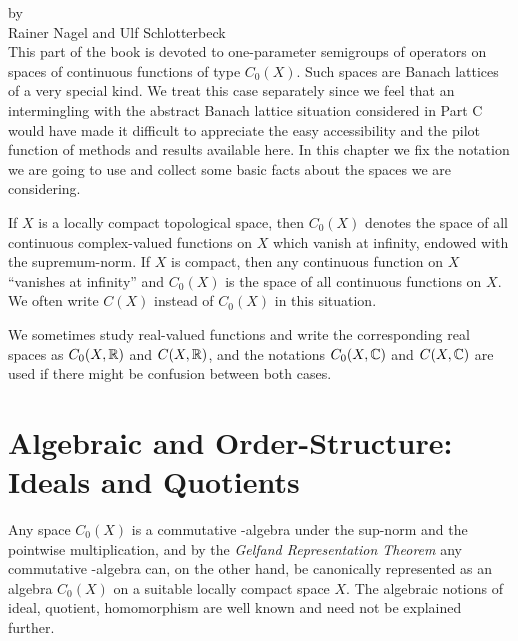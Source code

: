 \label{chap:b1}%
{\Large
\vspace*{-.75cm}
by \\[.25em]
Rainer Nagel and Ulf Schlotterbeck
\vspace{.75cm}
\\
}
This part of the book is devoted to one-parameter semigroups of operators on spaces of continuous functions of type $C_{0}(X)$.
Such spaces are Banach lattices of a very special kind.
We treat this case separately since we feel that an intermingling with the abstract Banach lattice situation considered in Part C would have made it difficult to appreciate the easy accessibility and the pilot function of methods and results available here.
In this chapter we fix the notation we are going to use and collect some basic facts about the spaces we are considering.

If $X$ is a locally compact topological space, then $C_{0}(X)$ denotes the space of all continuous complex-valued functions on $X$ which vanish at infinity, endowed with the supremum-norm.
If $X$ is compact, then any continuous function on $X$ \enquote{vanishes at infinity} and $C_{0}(X)$ is the space of all continuous functions on $X$.
We often write $C(X)$ instead of $C_{0}(X)$ in this situation.

We sometimes study real-valued functions and write the corresponding real spaces as $C_{0}(X,\mathbb{R})$ and 
$C(X,\mathbb{R})$, and the notations $C_{0}(X,\mathbb{C})$ and $C(X,\mathbb{C})$ are used if there might be confusion between both cases.
\section{Algebraic and Order-Structure: Ideals and Quotients}\label{sec:b1-1}%
Any space $C_{0}(X)$ is a commutative \CA-algebra under the sup-norm and the pointwise multiplication, and by the \emph{Gelfand Representation Theorem} any commutative \CA-algebra can, on the other hand, be canonically represented as an algebra $C_{0}(X)$ on a suitable locally compact space $X$.
The algebraic notions of ideal, quotient, homomorphism are well known and need not be explained further.

